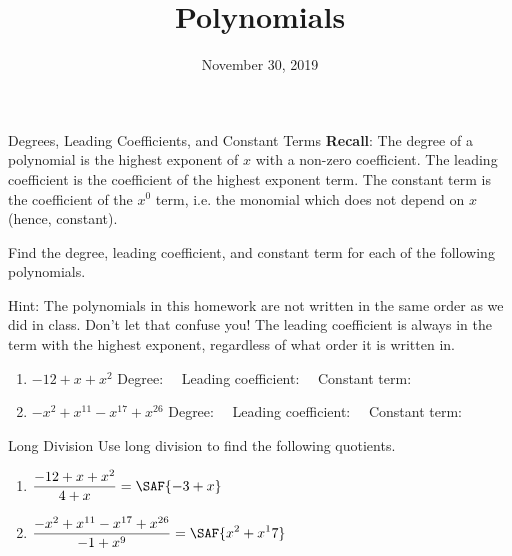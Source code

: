 \documentclass[12pt,letterpaper]{article}
\title{Polynomials}
\date{November 30, 2019}
\begin{document}
\maketitle

\thispagestyle{empty}


\begin{problem}{Degrees, Leading Coefficients, and Constant Terms}
  \textbf{Recall}: The degree of a polynomial is the highest exponent of $x$ with a non-zero
  coefficient. The leading coefficient is the coefficient of the highest exponent term. The
  constant term is the coefficient of the $x^0$ term, i.e. the monomial which does not
  depend on $x$ (hence, constant).

  \vspace{1em}
  \noindent Find the degree, leading coefficient, and constant term for each of the
  following polynomials.

  \vspace{1em}
  \noindent
  Hint: The polynomials in this homework are not written in the same order as we did in
  class. Don't let that confuse you! The leading coefficient is always in the term with the
  highest exponent, regardless of what order it is written in.

  \begin{enumerate}
    \item \(-12 + x + x^2\)
    \hfill Degree: ~~Leading coefficient: ~~Constant term: 
    \item \(-x^2 + x^{11} - x^{17} + x^{26}\)
    \hfill Degree: ~~Leading coefficient: ~~Constant term: 
  \end{enumerate}
\end{problem}

\begin{problem}{Long Division}
  Use long division to find the following quotients.

  \begin{enumerate}
    \item \(\displaystyle\frac{-12 + x + x^2}{4 + x} = \SAF{-3 + x}\)
    \item \(\displaystyle\frac{-x^2 + x^{11} - x^{17} + x^{26}}{-1 + x^9} = \SAF{x^2 +
    x^17}\) \end{enumerate}
\end{problem}
\end{document}
